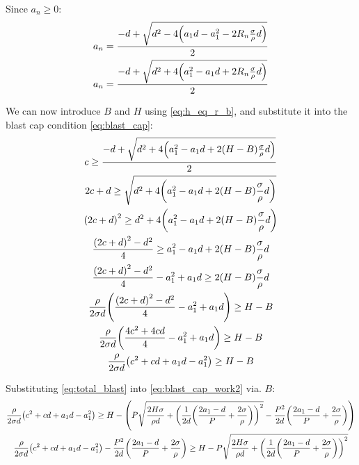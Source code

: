 \documentclass{article}
\begin{document}
Since $a_n \ge 0$:
\begin{gather}
    a_n = \frac{-d + \sqrt{d^2 - 4 \parens*{a_1 d - a_1^2 - 2 R_n \frac{\sigma}{\rho} d}}}{2} 
    \\
    a_n = \frac{-d + \sqrt{d^2 + 4 \parens*{a_1^2 - a_1 d + 2 R_n \frac{\sigma}{\rho} d}}}{2} 
\end{gather}

We can now introduce $B$ and $H$ using \eqref{eq:h_eq_r_b}, and substitute it into the blast cap condition \eqref{eq:blast_cap}:
\begin{gather}
    c \ge \frac{-d + \sqrt{d^2 + 4 \parens*{a_1^2 - a_1 d + 2 \parens*{H - B} \frac{\sigma}{\rho} d}}}{2} 
    \\
    2 c + d \ge \sqrt{d^2 + 4 \parens*{a_1^2 - a_1 d + 2 \parens*{H - B} \frac{\sigma}{\rho} d}}
    \\
    \parens*{2 c + d}^2 \ge d^2 + 4 \parens*{a_1^2 - a_1 d + 2 \parens*{H - B} \frac{\sigma}{\rho} d}
    \\
    \frac{\parens*{2 c + d}^2 - d^2}{4} \ge a_1^2 - a_1 d + 2 \parens*{H - B} \frac{\sigma}{\rho} d
    \\
    \frac{\parens*{2 c + d}^2 - d^2}{4} - a_1^2 + a_1 d \ge 2 \parens*{H - B} \frac{\sigma}{\rho} d
    \\
    \frac{\rho}{2 \sigma d} \parens*{\frac{\parens*{2 c + d}^2 - d^2}{4} - a_1^2 + a_1 d} \ge H - B
    \\
    \frac{\rho}{2 \sigma d} \parens*{\frac{4 c^2 + 4 c d}{4} - a_1^2 + a_1 d} \ge H - B
    \\
    \frac{\rho}{2 \sigma d} \parens*{c^2 + c d + a_1 d - a_1^2} \ge H - B
    \label{eq:blast_cap_work2}
\end{gather}

Substituting \eqref{eq:total_blast} into \eqref{eq:blast_cap_work2} via. $B$:
\begin{gather}
    \frac{\rho}{2 \sigma d} \parens*{c^2 + c d + a_1 d - a_1^2}
    \ge
    H
    - \parens*{
        P \sqrt{
            \frac{2 H \sigma}{\rho d}
            + \parens*{\frac{1}{2d} \parens*{\frac{2 a_1 - d}{P} + \frac{2 \sigma}{\rho}}}^2
        }
        - \frac{P^2}{2d} \parens*{\frac{2 a_1 - d}{P} + \frac{2 \sigma}{\rho}}
    }
    \\
    \frac{\rho}{2 \sigma d} \parens*{c^2 + c d + a_1 d - a_1^2}
    - \frac{P^2}{2d} \parens*{\frac{2 a_1 - d}{P} + \frac{2 \sigma}{\rho}}
    \ge
    H
    - P \sqrt{
        \frac{2 H \sigma}{\rho d}
        + \parens*{\frac{1}{2d} \parens*{\frac{2 a_1 - d}{P} + \frac{2 \sigma}{\rho}}}^2
    }
    \label{eq:blast_cap_work3}
\end{gather}
\end{document}
